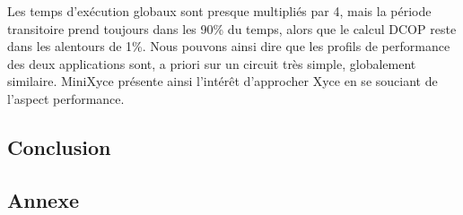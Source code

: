 \documentclass[11pt,a4paper,oneside]{memoir}
\theoremstyle{definition}
\theoremstyle{remark}
\theoremstyle{plain}
\begin{document}
Les temps d'exécution globaux sont presque multipliés par 4, mais la période transitoire prend toujours dans les 90\% du temps, alors que le calcul DCOP reste dans les alentours de 1\%. Nous pouvons ainsi dire que les profils de performance des deux applications sont, a priori sur un circuit très simple, globalement similaire. MiniXyce présente ainsi l'intérêt d'approcher Xyce en se souciant de l'aspect performance. 






















\begin{vplace}[0.5]

\chapter*{Conclusion}



\end{vplace}







\begin{vplace}
\chapter*{Annexe}


\end{vplace}




\nocite{*}


\end{document}
